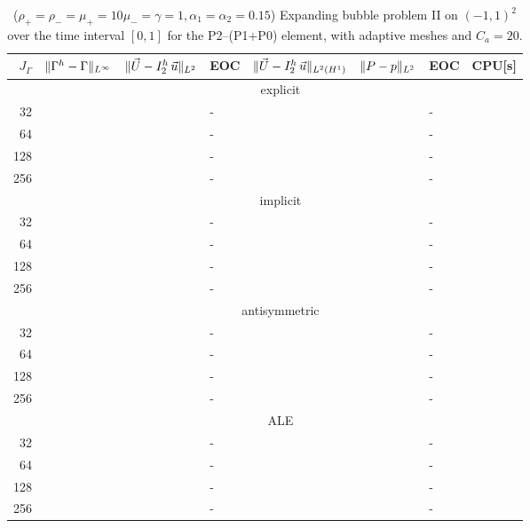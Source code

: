 \begin{table}
\center
\hspace*{-3.25cm}
\begin{tabular}{rllllllr}
\hline
$J_\Gamma$ & $\|\Gamma^h - \Gamma\|_{L^\infty}$ & $\|\vec U - I^h_{2}\,\vec u\|_{L^2}$ & EOC & $\|\vec U - I^h_{2}\,\vec u\|_{L^2(H^1)}$ & $\|P - p\|_{L^2}$ & EOC
& CPU[s] \\
\hline
& \multicolumn{7}{c}{explicit} \\
\hline
 32 & & & - & & & - & \\
 64 & & & - & & & - & \\
128 & & & - & & & - & \\
256 & & & - & & & - & \\
\hline
& \multicolumn{7}{c}{implicit} \\
\hline
 32 & & & - & & & - & \\
 64 & & & - & & & - & \\
128 & & & - & & & - & \\
256 & & & - & & & - & \\
\hline
& \multicolumn{7}{c}{antisymmetric} \\
\hline
 32 & & & - & & & - & \\
 64 & & & - & & & - & \\
128 & & & - & & & - & \\
256 & & & - & & & - & \\
\hline
& \multicolumn{7}{c}{ALE} \\
\hline
 32 & & & - & & & - & \\
 64 & & & - & & & - & \\
128 & & & - & & & - & \\
256 & & & - & & & - & \\
\hline
\end{tabular}
\hspace*{-3.25cm}
\caption[Navier--Stokes expanding bubble II errors P2--(P1+P0)]
{($\rho_+ = \rho_- = \mu_+ = 10\mu_- = \gamma = 1,\alpha_1=\alpha_2=0.15$)
Expanding bubble problem II on $(-1,1)^2$ over the time interval $[0,1]$ for
the P2--(P1+P0) element, with adaptive meshes and $C_a=20$\textdegree.}
\label{tab:nsexpandingbubbleIIp2p1p0}
\end{table}

